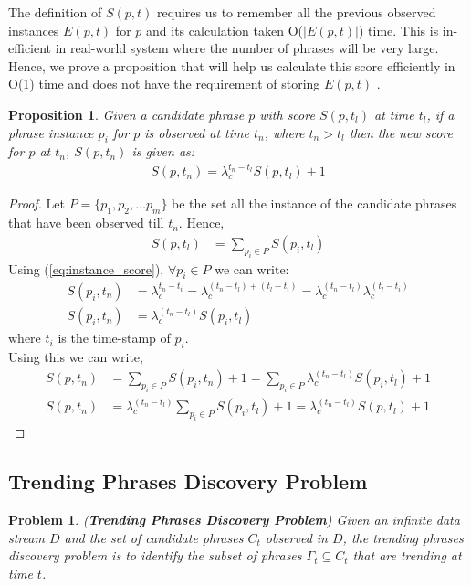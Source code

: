 \documentclass{sig-alternate}
\newtheorem{proposition}{Proposition}[section]
\newtheorem{problem}{Problem}
\begin{document}
The definition of $S(p, t)$ requires us to remember all the previous observed instances $E(p, t)$ for $p$ and its calculation taken O($|E(p, t)|$) time. This is in-efficient in real-world system where the number of phrases will be very large. Hence, we prove a proposition that will help us calculate this score efficiently in O(1) time and does not have the requirement of storing $E(p, t)$ .

\begin{proposition} 
Given a candidate phrase $p$ with score $S(p, t_l)$ at time $t_l$, if a phrase instance $p_i$ for $p$ is observed at time $t_n$, where $t_n>t_l$ then the new score for $p$ at $t_n$, $S(p, t_n)$  is given as:
\begin{align*}
S(p, t_n) =  \lambda_c ^{t_{n}-t_{l}} S(p, t_l) + 1
\end{align*}
\label{pro:candidate-phrase-score}
\end{proposition}
\begin{proof}
Let $P = \{p_1, p_2, \dots p_m\}$ be the set all the instance of the candidate phrases that have been observed till $t_n$. Hence,
\begin{align*}
S(p, t_l) &= \sum_{p_i \in P} S(p_i, t_l)
\end{align*}
\noindent Using (\ref{eq:instance_score}),  $\forall p_i \in P$ we can write:
\begin{align*}
S(p_i, t_n) &=  \lambda_c ^{t_{n}-t_{i}} = \lambda_c ^{(t_{n}-t_l) + (t_l - t_i) } = \lambda_c ^{(t_{n}-t_l)} \lambda_c ^{(t_l - t_i)} \\
S(p_i, t_n) &=\lambda_c ^{(t_{n}-t_l)}S(p_i, t_l)
\end{align*}
\noindent where $t_i$ is the time-stamp of $p_i$.\\

\noindent Using this we can write,
\begin{align*}
S(p, t_n) &= \sum_{p_i \in P} S(p_i, t_n) + 1  =  \sum_{p_i \in P} \lambda_c ^{(t_{n}-t_l)}S(p_i, t_l) + 1 \\
S(p, t_n) &=  \lambda_c ^{(t_{n}-t_l)}  \sum_{p_i \in P} S(p_i, t_l) + 1 =  \lambda_c ^{(t_{n}-t_l)} S(p, t_l) + 1
\end{align*}
\end{proof}

\subsection{Trending Phrases Discovery Problem}
\label{sec:trend:discovery:problem}
\begin{problem}
(\textbf{Trending Phrases Discovery Problem}) Given an infinite data stream $D$  and the set of candidate phrases $C_t$ observed in $D$, the trending phrases discovery problem is to identify the subset of phrases $\Gamma_t \subseteq C_t$ that are trending at time $t$.
\end{problem}
\end{document}

